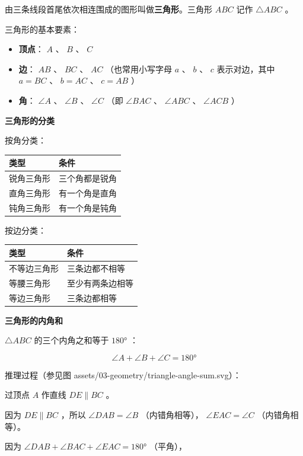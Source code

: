 \begin{understand}


由三条线段首尾依次相连围成的图形叫做\textbf{三角形}。三角形 $ABC$ 记作 $\triangle ABC$ 。

三角形的基本要素：
\begin{itemize}
  \item \textbf{顶点}： $A$ 、 $B$ 、 $C$
  \item \textbf{边}： $AB$ 、 $BC$ 、 $AC$ （也常用小写字母 $a$ 、 $b$ 、 $c$ 表示对边，其中 $a = BC$ 、 $b = AC$ 、 $c = AB$ ）
  \item \textbf{角}： $\angle A$ 、 $\angle B$ 、 $\angle C$ （即 $\angle BAC$ 、 $\angle ABC$ 、 $\angle ACB$ ）
\end{itemize}


\textbf{三角形的分类}

按角分类：
\begin{center}
\begin{tabular}{ll}
\toprule
类型 & 条件 \\
\midrule
锐角三角形 & 三个角都是锐角 \\
直角三角形 & 有一个角是直角 \\
钝角三角形 & 有一个角是钝角 \\
\bottomrule
\end{tabular}
\end{center}


按边分类：
\begin{center}
\begin{tabular}{ll}
\toprule
类型 & 条件 \\
\midrule
不等边三角形 & 三条边都不相等 \\
等腰三角形 & 至少有两条边相等 \\
等边三角形 & 三条边都相等 \\
\bottomrule
\end{tabular}
\end{center}


\textbf{三角形的内角和}

$\triangle ABC$ 的三个内角之和等于 $180°$ ：

\[
\angle A + \angle B + \angle C = 180°
\]


推理过程（参见图 assets/03-geometry/triangle-angle-sum.svg）：

过顶点 $A$ 作直线 $DE \parallel BC$ 。

因为 $DE \parallel BC$ ，所以 $\angle DAB = \angle B$ （内错角相等）， $\angle EAC = \angle C$ （内错角相等）。

因为 $\angle DAB + \angle BAC + \angle EAC = 180°$ （平角），


\end{understand}
